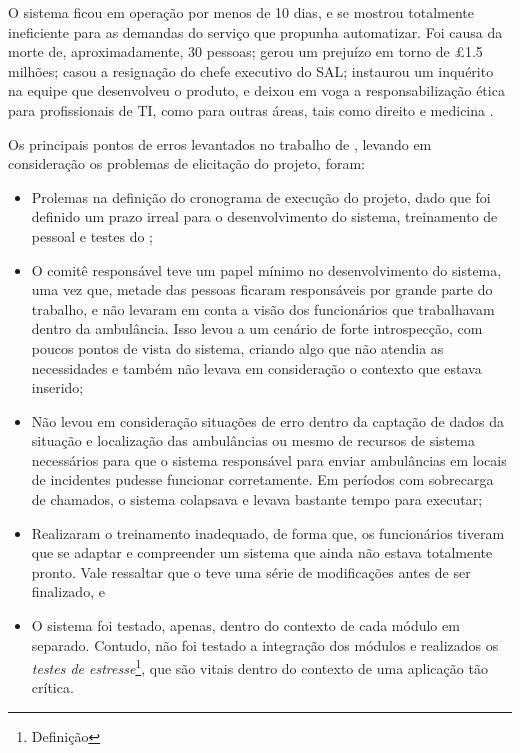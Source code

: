 O sistema ficou em operação por menos de 10 dias, e se mostrou totalmente ineficiente para as demandas do serviço que propunha automatizar. Foi causa da morte de, aproximadamente, 30 pessoas; gerou um prejuízo em torno de £1.5 milhões; casou a resignação do chefe executivo do SAL; instaurou um inquérito na equipe que desenvolveu o produto, e deixou em voga a responsabilização ética para profissionais de TI, como para outras áreas, tais como direito e medicina \cite{LodonFiasco}.

Os principais pontos de erros levantados no trabalho de \cite{LodonFiasco}, levando em consideração os problemas de elicitação do projeto, foram:

\begin{itemize}
    \item Prolemas na definição do cronograma de execução do projeto, dado que foi definido um prazo irreal para o desenvolvimento do sistema, treinamento de pessoal e testes do ;
    
    \item O comitê responsável teve um papel mínimo no desenvolvimento do sistema, uma vez que, metade das pessoas ficaram responsáveis por grande parte do trabalho, e não levaram em conta a visão dos funcionários que trabalhavam dentro da ambulância. Isso levou a um cenário de forte introspecção, com poucos pontos de vista do sistema, criando algo que não atendia as necessidades e também não levava em consideração o contexto que estava inserido;
    
    \item Não levou em consideração situações de erro dentro da captação de dados da situação e localização das ambulâncias ou mesmo de recursos de sistema necessários para que o sistema responsável para enviar ambulâncias em locais de incidentes pudesse funcionar corretamente. Em períodos com sobrecarga de chamados, o sistema colapsava e levava bastante tempo para executar;
    
    \item Realizaram o treinamento inadequado, de forma que, os funcionários tiveram que se adaptar e compreender um sistema que ainda não estava totalmente pronto. Vale ressaltar que o  teve uma série de modificações antes de ser finalizado, e
    
    \item O sistema foi testado, apenas, dentro do contexto de cada módulo em separado. Contudo, não foi testado a integração dos módulos e realizados os \textit{testes de estresse}\footnote{Definição}, que são vitais dentro do contexto de uma aplicação tão crítica.
\end{itemize}

